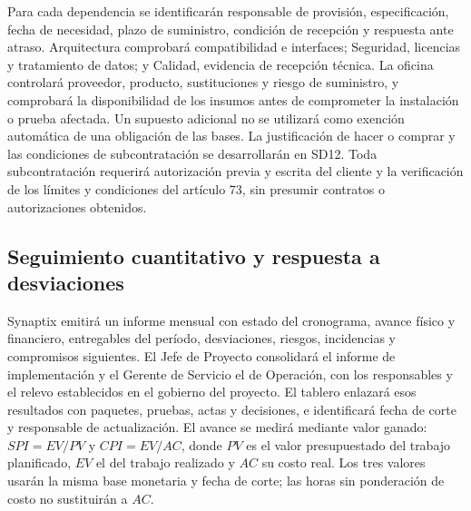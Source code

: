 Para cada dependencia se identificarán responsable de provisión, especificación, fecha de necesidad, plazo de suministro, condición de recepción y respuesta ante atraso. Arquitectura comprobará compatibilidad e interfaces; Seguridad, licencias y tratamiento de datos; y Calidad, evidencia de recepción técnica. La oficina controlará proveedor, producto, sustituciones y riesgo de suministro, y comprobará la disponibilidad de los insumos antes de comprometer la instalación o prueba afectada. Un supuesto adicional no se utilizará como exención automática de una obligación de las bases. La justificación de hacer o comprar y las condiciones de subcontratación se desarrollarán en SD12. Toda subcontratación requerirá autorización previa y escrita del cliente y la verificación de los límites y condiciones del artículo 73, sin presumir contratos o autorizaciones obtenidos. \parencite[arts.~71--73, pp.~37--38]{sd6-ba}

\subsection{Seguimiento cuantitativo y respuesta a desviaciones}
Synaptix emitirá un informe mensual con estado del cronograma, avance físico y financiero, entregables del período, desviaciones, riesgos, incidencias y compromisos siguientes. El Jefe de Proyecto consolidará el informe de implementación y el Gerente de Servicio el de Operación, con los responsables y el relevo establecidos en el gobierno del proyecto. El tablero enlazará esos resultados con paquetes, pruebas, actas y decisiones, e identificará fecha de corte y responsable de actualización. El avance se medirá mediante valor ganado: $SPI=EV/PV$ y $CPI=EV/AC$, donde $PV$ es el valor presupuestado del trabajo planificado, $EV$ el del trabajo realizado y $AC$ su costo real. Los tres valores usarán la misma base monetaria y fecha de corte; las horas sin ponderación de costo no sustituirán a $AC$. \parencites[RT-19.06--08, p.~34]{sd6-bt}[p.~1]{sd6-nasa}

